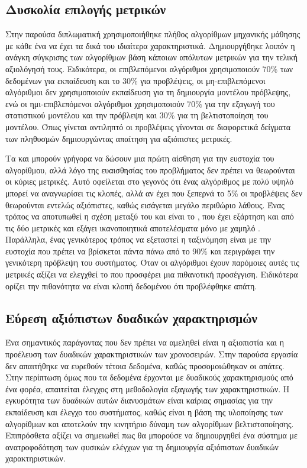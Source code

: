 \subsection{Δυσκολία επιλογής μετρικών}
Στην παρούσα διπλωματική χρησιμοποιήθηκε πλήθος αλγορίθμων μηχανικής μάθησης με κάθε ένα να έχει τα δικά του ιδιαίτερα χαρακτηριστικά. Δημιουργήθηκε λοιπόν η ανάγκη σύγκρισης των αλγορίθμων βάση κάποιων απόλυτων μετρικών για την τελική αξιολόγησή τους. Ειδικότερα, οι επιβλεπόμενοι αλγόριθμοι χρησιμοποιούν 70\% των δεδομένων για εκπαίδευση και το 30\% για προβλέψεις, οι μη-επιβλεπόμενοι αλγόριθμοι δεν χρησιμοποιούν εκπαίδευση για τη δημιουργία μοντέλου πρόβλεψης, ενώ οι ημι-επιβλεπόμενοι αλγόριθμοι χρησιμοποιούν 70\% για την εξαγωγή του στατιστικού μοντέλου και την πρόβλεψη και 30\% για τη βελτιστοποίηση του μοντέλου. Όπως γίνεται αντιληπτό οι προβλέψεις γίνονται σε διαφορετικά δείγματα των πληθυσμών δημιουργώντας απαίτηση για αξιόπιστες μετρικές.\par
Τα  και  μπορούν γρήγορα να δώσουν μια πρώτη αίσθηση για την ευστοχία του αλγορίθμου, αλλά λόγο της ευαισθησίας του προβλήματος δεν πρέπει να θεωρούνται οι κύριες μετρικές. Αυτό οφείλεται στο γεγονός ότι ένας αλγόριθμος με πολύ υψηλό  μπορεί να αναγνωρίσει τις κλοπές, αλλά αν έχει  που ξεπερνά το 5\% οι προβλέψεις δεν θεωρούνται εντελώς αξιόπιστες, καθώς εισάγεται μεγάλο περιθώριο λάθους. Ένας τρόπος να αποτυπωθεί η σχέση μεταξύ του  και  είναι το , που έχει εξάρτηση και από τις δύο μετρικές και εξάγει ικανοποιητικά αποτελέσματα μόνο με χαμηλό . Παράλληλα, ένας γενικότερος τρόπος να εξεταστεί η ταξινόμηση είναι με την ευστοχία  που πρέπει να βρίσκεται πάντα πάνω από το 90\% και περιγράφει την γενικότερη πρόβλεψη του συστήματος. Όταν οι αλγόριθμοι έχουν παρόμοιες αυτές τις μετρικές αξίζει να ελεγχθεί το  που προσφέρει μια πιθανοτική προσέγγιση. Ειδικότερα ορίζει την πιθανότητα να είναι κλοπή δεδομένου ότι προβλέφθηκε απάτη.
\subsection{Εύρεση αξιόπιστων δυαδικών χαρακτηρισμών}
Ένα σημαντικός παράγοντας που δεν πρέπει να αμεληθεί είναι η αξιοπιστία και η προέλευση των δυαδικών χαρακτηριστικών των χρονοσειρών. Στην παρούσα εργασία δεν απαιτήθηκε να ευρεθούν τέτοια δεδομένα, καθώς προσομοιώθηκαν οι απάτες. Στην περίπτωση όμως που τα δεδομένα έρχονται με δυαδικούς χαρακτηρισμούς από ένα φορέα, απαιτείται έλεγχος στη μεθοδολογία εξαγωγής των χαρακτηριστικών. Η εγκυρότητα των δυαδικών αυτών διανυσμάτων είναι καίριας σημασίας για την εκπαίδευση και έλεγχο του συστήματος, καθώς είναι η βάση της υλοποίησης των αλγορίθμων και αποτελούν την κινητήριο δύναμη των αλγορίθμων βελτιστοποίησης. Επιπρόσθετα αξίζει να σημειωθεί πως θα μπορούσε να δημιουργηθεί ένα σύστημα με ανατροφοδότηση των φυσικών ελέγχων για τη δημιουργία αξιόπιστων δυαδικών χαρακτηριστικών.\par
